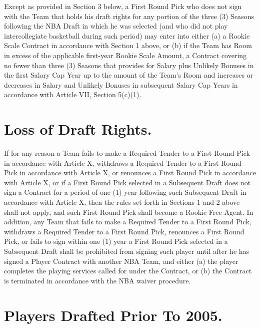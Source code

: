 \documentclass[
]{book}
\begin{document}
Except as provided in Section 3 below, a First Round Pick who does not sign with the Team that holds his draft rights for any portion of the three (3) Seasons following the NBA Draft in which he was selected (and who did not play intercollegiate basketball during such period) may enter into either (a) a Rookie Scale Contract in accordance with Section 1 above, or (b) if the Team has Room in excess of the applicable first-year Rookie Scale Amount, a Contract covering no fewer than three (3) Seasons that provides for Salary plus Unlikely Bonuses in the first Salary Cap Year up to the amount of the Team's Room and increases or decreases in Salary and Unlikely Bonuses in subsequent Salary Cap Years in accordance with Article VII, Section 5(c)(1).

\hypertarget{loss-of-draft-rights.}{%
\section{Loss of Draft Rights.}\label{loss-of-draft-rights.}}

If for any reason a Team fails to make a Required Tender to a First Round Pick in accordance with Article X, withdraws a Required Tender to a First Round Pick in accordance with Article X, or renounces a First Round Pick in accordance with Article X, or if a First Round Pick selected in a Subsequent Draft does not sign a Contract for a period of one (1) year following such Subsequent Draft in accordance with Article X, then the rules set forth in Sections 1 and 2 above shall not apply, and such First Round Pick shall become a Rookie Free Agent. In addition, any Team that fails to make a Required Tender to a First Round Pick, withdraws a Required Tender to a First Round Pick, renounces a First Round Pick, or fails to sign within one (1) year a First Round Pick selected in a Subsequent Draft shall be prohibited from signing such player until after he has signed a Player Contract with another NBA Team, and either (a) the player completes the playing services called for under the Contract, or (b) the Contract is terminated in accordance with the NBA waiver procedure.

\hypertarget{players-drafted-prior-to-2005.}{%
\section{Players Drafted Prior To 2005.}\label{players-drafted-prior-to-2005.}}
\end{document}
